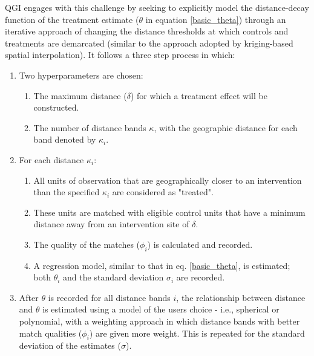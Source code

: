 \documentclass[sustainability,article,submit,moreauthors,pdftex]{Definitions/mdpi}
\begin{document}
QGI engages with this challenge by seeking to explicitly model the distance-decay function of the treatment estimate ($\theta$ in equation \eqref{basic_theta}) through an iterative approach of changing the distance thresholds at which controls and treatments are demarcated (similar to the approach adopted by kriging-based spatial interpolation).  It follows a three step process in which:
\begin{enumerate}
    \item Two hyperparameters are chosen:
    \begin{enumerate}
        \item The maximum distance ($\delta$) for which a treatment effect will be constructed.
        \item The number of distance bands $\kappa$, with the geographic distance for each band denoted by $\kappa_{i}$.
    \end{enumerate}
    \item For each distance $\kappa_{i}$:
    \begin{enumerate}
        \item All units of observation that are geographically closer to an intervention than the specified $\kappa_{i}$ are considered as "treated".
        \item These units are matched with eligible control units that have a minimum distance away from an intervention site of $\delta$.
        \item The quality of the matches ($\phi_{i}$) is calculated and recorded.
        \item A regression model, similar to that in eq. \eqref{basic_theta}, is estimated;  both $\theta_{i}$ and the standard deviation $\sigma_{i}$ are recorded.
    \end{enumerate}
    \item After $\theta$ is recorded for all distance bands $i$, the relationship between distance and $\theta$ is estimated using a model of the users choice - i.e., spherical or polynomial, with a weighting approach in which distance bands with better match qualities ($\phi_{i}$) are given more weight.  This is repeated for the standard deviation of the estimates ($\sigma$).
\end{enumerate}
\end{document}
